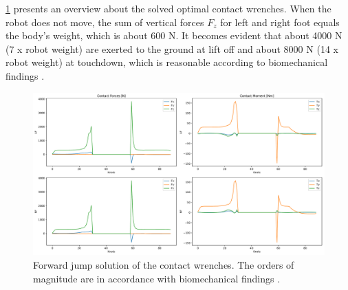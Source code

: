 \cref{fig:jumpForward_ContactWrenches} presents an overview about the solved optimal contact wrenches. When the robot does not move, the sum of vertical forces $F_z$ for left and right foot equals the body's weight, which is about 600 N. It becomes evident that about 4000 N (7 \nolinebreak x robot weight) are exerted to the ground at lift off and about 8000 N (14 x robot weight) at touchdown, which is reasonable according to biomechanical findings \cite{meghdari2002dynamical}.
\begin{figure}[h!]
\centering	
\includegraphics[width=1\textwidth]{fig/jumpForward/ContactWrenches}
\caption[Forward jump solution of the contact wrenches]{Forward jump solution of the contact wrenches. The orders of magnitude are in accordance with biomechanical findings \cite{meghdari2002dynamical}.}
\label{fig:jumpForward_ContactWrenches}
\end{figure} 

